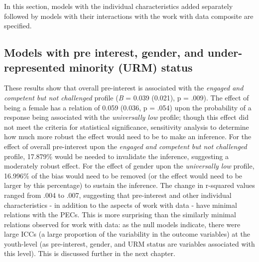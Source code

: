 \documentclass[]{book}
\theoremstyle{definition}
\theoremstyle{definition}
\theoremstyle{definition}
\theoremstyle{remark}
\begin{document}
In this section, models with the individual characteristics added
separately followed by models with their interactions with the work with
data composite are specified.

\subsection{Models with pre interest, gender, and under-represented
minority (URM)
status}\label{models-with-pre-interest-gender-and-under-represented-minority-urm-status}

These results show that overall pre-interest is associated with the
\emph{engaged and competent but not challenged} profile (\emph{B} =
0.039 (0.021), p = .009). The effect of being a female has a relation of
0.059 (0.036, p = .054) upon the probability of a response being
associated with the \emph{universally low} profile; though this effect
did not meet the criteria for statistical significance, sensitivity
analysis to determine how much more robust the effect would need to be
to make an inference. For the effect of overall pre-interest upon the
\emph{engaged and competent but not challenged} profile, 17.879\% would
be needed to invalidate the inference, suggesting a moderately robust
effect. For the effect of gender upon the \emph{universally low}
profile, 16.996\% of the bias would need to be removed (or the effect
would need to be larger by this percentage) to sustain the inference.
The change in r-squared values ranged from .004 to .007, suggesting that
pre-interest and other individual characteristics - in addition to the
aspects of work with data - have minimal relations with the PECs. This
is more surprising than the similarly minimal relations observed for
work with data: as the null models indicate, there were large ICCs (a
large proportion of the variability in the outcome variables) at the
youth-level (as pre-interest, gender, and URM status are variables
associated with this level). This is discussed further in the next
chapter.
\end{document}
